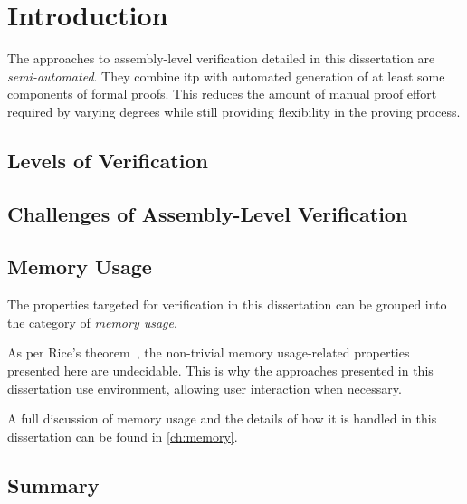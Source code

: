 \chapter{Introduction}
The approaches to assembly-level verification detailed in this dissertation%
are \emph{semi-automated}.
They combine \ac{itp} with automated generation
of at least some components of formal proofs.
This reduces the amount of manual proof effort required by varying degrees
while still providing flexibility in the proving process.


\section{Levels of Verification}  
\section{Challenges of Assembly-Level Verification}
\section{Memory Usage}
The properties targeted for verification in this dissertation
can be grouped into the category of \emph{memory usage}.%


As per Rice's theorem~\citep{rice1953classes},
the non-trivial memory usage-related properties presented here are undecidable.%
This is why the approaches presented in this dissertation
use  environment, allowing user interaction when necessary.

A full discussion of memory usage
and the details of how it is handled in this dissertation
can be found in \cref{ch:memory}.

\section{Summary}
